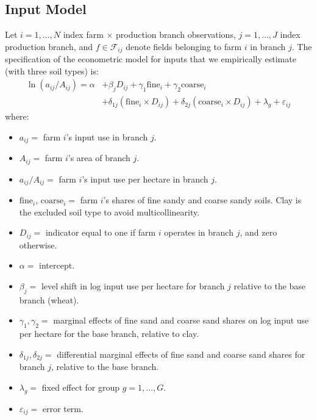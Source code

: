 \documentclass{scrartcl}
\begin{document}
\subsection*{Input Model}
Let $i = 1, \ldots, N$ index farm $\times$ production branch observations, $j = 1, \ldots, J$ index production branch, and $f \in \mathcal{F}_{ij}$ denote fields belonging to farm $i$ in branch $j$.
The specification of the econometric model for inputs that we empirically estimate (with three soil types) is:
\begin{equation}
\begin{aligned}
    \ln(a_{ij}/A_{ij}) = \alpha & + \beta_j D_{ij} + \gamma_1 \text{fine}_i + \gamma_2 \text{coarse}_i \\
    & + \delta_{1j}(\text{fine}_i \times D_{ij}) + \delta_{2j}(\text{coarse}_i \times D_{ij})
    + \lambda_g + \varepsilon_{ij}
    \label{eq:model-spec-inputs}
\end{aligned}
\end{equation}
where:
\begin{itemize}
    \item $a_{ij} =$ farm $i$'s input use in branch $j$.
    \item $A_{ij} =$ farm $i$'s area of branch $j$.
    \item $a_{ij}/A_{ij} =$ farm $i$'s input use per hectare in branch $j$.
    \item $\text{fine}_i$, $\text{coarse}_i =$ farm $i$'s shares of fine sandy and coarse sandy soils.
    Clay is the excluded soil type to avoid multicollinearity.
    \item $D_{ij} =$ indicator equal to one if farm $i$ operates in branch $j$, and zero otherwise.
    \item $\alpha =$ intercept.
    \item $\beta_j =$ level shift in log input use per hectare for branch $j$ relative to the base branch (wheat).
    \item $\gamma_1, \gamma_2 =$ marginal effects of fine sand and coarse sand shares on log input use per hectare for the base branch, relative to clay.
    \item $\delta_{1j}, \delta_{2j} =$ differential marginal effects of fine sand and coarse sand shares for branch $j$, relative to the base branch.
    \item $\lambda_g =$ fixed effect for group $g = 1, \ldots, G$.
    \item $\varepsilon_{ij} =$ error term.
\end{itemize}
\end{document}
